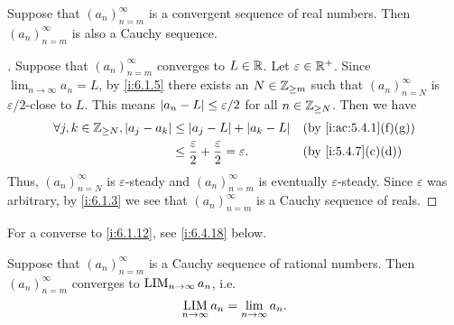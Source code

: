 \begin{prop}\label{i:6.1.12}
  Suppose that \((a_n)_{n = m}^\infty\) is a convergent sequence of real numbers.
  Then \((a_n)_{n = m}^\infty\) is also a Cauchy sequence.
\end{prop}

\begin{proof}[]
  Suppose that \((a_n)_{n = m}^\infty\) converges to \(L \in \mathbb{R}\).
  Let \(\varepsilon \in \mathbb{R}^+\).
  Since \(\lim_{n \to \infty} a_n = L\), by \cref{i:6.1.5} there exists an \(N \in \mathbb{Z}_{\geq m}\) such that \((a_n)_{n = N}^\infty\) is \(\varepsilon / 2\)-close to \(L\).
  This means \(\left\lvert a_n - L\right\rvert \leq \varepsilon / 2\) for all \(n \in \mathbb{Z}_{\geq N}\).
  Then we have
  \begin{align*}
    \forall j, k \in \Z_{\geq N}, \abs{a_j - a_k} & \leq \abs{a_j - L} + \abs{a_k - L}                                  &  & \by{i:ac:5.4.1}[f,g] \\
                                                  & \leq \dfrac{\varepsilon}{2} + \dfrac{\varepsilon}{2} = \varepsilon. &  & \by{i:5.4.7}[c,d]
  \end{align*}
  Thus, \((a_n)_{n = N}^\infty\) is \(\varepsilon\)-steady and \((a_n)_{n = m}^\infty\) is eventually \(\varepsilon\)-steady.
  Since \(\varepsilon\) was arbitrary, by \cref{i:6.1.3} we see that \((a_n)_{n = m}^\infty\) is a Cauchy sequence of reals.
\end{proof}

\setcounter{thm}{13}
\begin{rmk}\label{i:6.1.14}
  For a converse to \cref{i:6.1.12}, see \cref{i:6.4.18} below.
\end{rmk}

\begin{prop}\label{i:6.1.15}
  Suppose that \((a_n)_{n = m}^\infty\) is a Cauchy sequence of rational numbers.
  Then \((a_n)_{n = m}^\infty\) converges to \(\operatorname*{LIM}_{n \to \infty} a_n\), i.e.
  \[
    \operatorname*{LIM}_{n \to \infty} a_n = \lim_{n \to \infty} a_n.
  \]
\end{prop}

